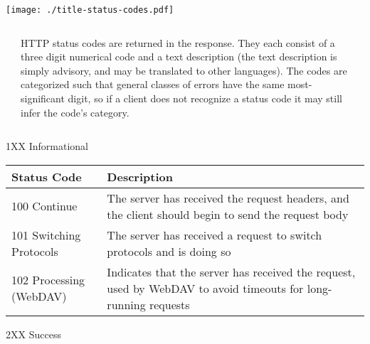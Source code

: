 \documentclass[final,table]{beamer}
\begin{document}
  \begin{frame}{}

    \begin{minipage}{\textwidth}
      \centering
      \texttt{[image: ./title-status-codes.pdf]}
    \end{minipage}

    \vspace{0.5in}

    \begin{columns}
      \begin{column}{0.05\textwidth}
      \end{column}
      \begin{column}{0.9\textwidth}
        \begin{block}{}
          \large
            HTTP status codes are returned in the response. They each consist of
            a three digit numerical code and a text description (the text
            description is simply advisory, and may be translated to other
            languages). The codes are categorized such that general classes of
            errors have the same most-significant digit, so if a client does not
            recognize a status code it may still infer the code's category.
          \normalsize
        \end{block}
      \end{column}
      \begin{column}{0.05\textwidth}
      \end{column}
    \end{columns}

    \vspace{0.5in}

    \begin{block}{\huge 1XX Informational}

      \vspace{0.3in}

      \begin{tabular}{p{} p{}}
        Status Code & Description \\ \hline
        100 Continue & The server has received the request headers, and the client should begin to send the request body \\
        101 Switching Protocols & The server has received a request to switch protocols and is doing so \\
        102 Processing (WebDAV) & Indicates that the server has received the request, used by WebDAV to avoid timeouts for long-running requests \\
      \end{tabular}
    \end{block}
    \begin{block}{\huge 2XX Success}


\end{block}
\end{frame}
\end{document}
